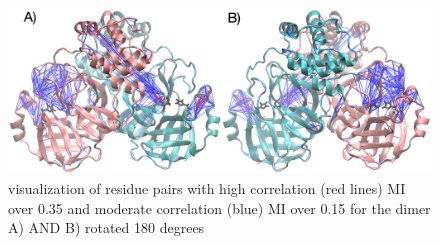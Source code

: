 \documentclass{biophys-new}
\begin{document}
\begin{figure}[hbt!]
\centering
\includegraphics[width=0.6\linewidth]{supplemental_figures/dimer_MI_image.png}
\caption{visualization of residue pairs with high correlation (red lines) MI over 0.35 and moderate correlation (blue) MI over 0.15 for the dimer A) AND B) rotated 180 degrees}
\label{fig:view}
\end{figure}
\end{document}
